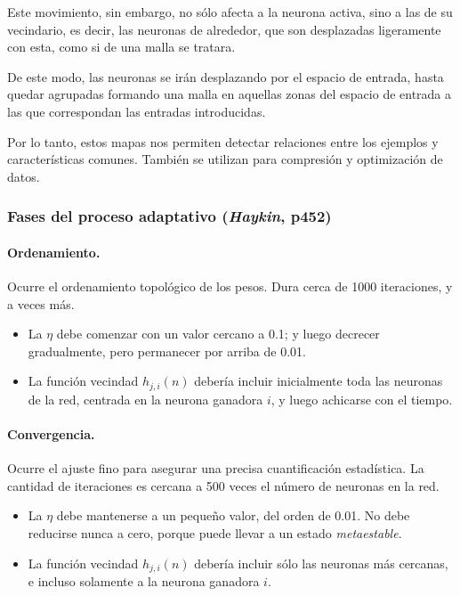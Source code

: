 \documentclass[10pt,a4paper]{article}
\begin{document}
Este movimiento, sin embargo, no sólo afecta a la neurona activa, sino a las de su vecindario, es decir, las neuronas de alrededor, que son desplazadas ligeramente con esta, como si de una malla se tratara.

De este modo, las neuronas se irán desplazando por el espacio de entrada, hasta quedar agrupadas formando una malla en aquellas zonas del espacio de entrada a las que correspondan las entradas introducidas.

Por lo tanto, estos mapas nos permiten detectar relaciones entre los ejemplos y características comunes. También se utilizan para compresión y optimización de datos.

\subsubsection{Fases del proceso adaptativo (\textit{Haykin}, p452)}
\paragraph{Ordenamiento.} Ocurre el ordenamiento topológico de los pesos. Dura cerca de 1000 iteraciones, y a veces más.
\begin{itemize}
\item La $\eta$ debe comenzar con un valor cercano a 0.1; y luego decrecer gradualmente, pero permanecer por arriba de 0.01.
\item La función vecindad $h_{j,i}(n)$ debería incluir inicialmente toda las neuronas de la red, centrada en la neurona ganadora $i$, y luego achicarse con el tiempo.
\end{itemize}

\paragraph{Convergencia.} Ocurre el ajuste fino para asegurar una precisa cuantificación estadística. La cantidad de iteraciones es cercana a 500 veces el número de neuronas en la red.
\begin{itemize}
\item La $\eta$ debe mantenerse a un pequeño valor, del orden de 0.01. No debe reducirse nunca a cero, porque puede llevar a un estado \textit{metaestable}.
\item La función vecindad $h_{j,i}(n)$ debería incluir sólo las neuronas más cercanas, e incluso solamente a la neurona ganadora $i$.
\end{itemize}
\end{document}
